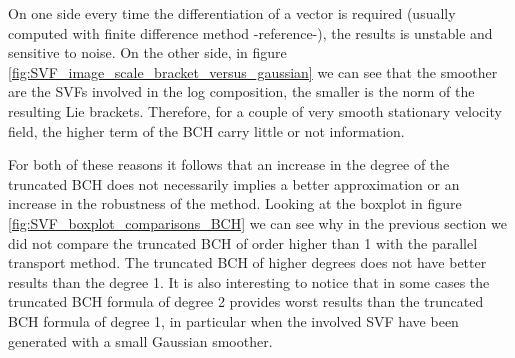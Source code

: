 On one side every time the differentiation of a vector is required (usually computed with finite difference method -reference-), the results is unstable and sensitive to noise. On the other side, in figure \ref{fig:SVF_image_scale_bracket_versus_gaussian} we can see that the smoother are the SVFs involved in the log composition, the smaller is the norm of the resulting Lie brackets. Therefore, for a couple of very smooth stationary velocity field, the higher term of the BCH carry little or not information.

For both of these reasons it follows that an increase in the degree of the truncated BCH does not necessarily implies a better approximation or an increase in the robustness of the method. Looking at the boxplot in figure \ref{fig:SVF_boxplot_comparisons_BCH} we can see why in the previous section we did not compare the truncated BCH of order higher than 1 with the parallel transport method. The truncated BCH of higher degrees does not have better results than the degree 1. It is also interesting to notice that in some cases the truncated BCH formula of degree 2 provides worst results than the truncated BCH formula of degree 1, in particular when the involved SVF have been generated with a small Gaussian smoother.

